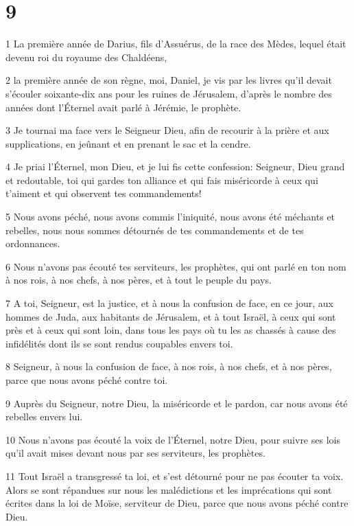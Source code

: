 \chapter{9}

\par 1 La première année de Darius, fils d'Assuérus, de la race des Mèdes, lequel était devenu roi du royaume des Chaldéens,
\par 2 la première année de son règne, moi, Daniel, je vis par les livres qu'il devait s'écouler soixante-dix ans pour les ruines de Jérusalem, d'après le nombre des années dont l'Éternel avait parlé à Jérémie, le prophète.
\par 3 Je tournai ma face vers le Seigneur Dieu, afin de recourir à la prière et aux supplications, en jeûnant et en prenant le sac et la cendre.
\par 4 Je priai l'Éternel, mon Dieu, et je lui fis cette confession: Seigneur, Dieu grand et redoutable, toi qui gardes ton alliance et qui fais miséricorde à ceux qui t'aiment et qui observent tes commandements!
\par 5 Nous avons péché, nous avons commis l'iniquité, nous avons été méchants et rebelles, nous nous sommes détournés de tes commandements et de tes ordonnances.
\par 6 Nous n'avons pas écouté tes serviteurs, les prophètes, qui ont parlé en ton nom à nos rois, à nos chefs, à nos pères, et à tout le peuple du pays.
\par 7 A toi, Seigneur, est la justice, et à nous la confusion de face, en ce jour, aux hommes de Juda, aux habitants de Jérusalem, et à tout Israël, à ceux qui sont près et à ceux qui sont loin, dans tous les pays où tu les as chassés à cause des infidélités dont ils se sont rendus coupables envers toi.
\par 8 Seigneur, à nous la confusion de face, à nos rois, à nos chefs, et à nos pères, parce que nous avons péché contre toi.
\par 9 Auprès du Seigneur, notre Dieu, la miséricorde et le pardon, car nous avons été rebelles envers lui.
\par 10 Nous n'avons pas écouté la voix de l'Éternel, notre Dieu, pour suivre ses lois qu'il avait mises devant nous par ses serviteurs, les prophètes.
\par 11 Tout Israël a transgressé ta loi, et s'est détourné pour ne pas écouter ta voix. Alors se sont répandues sur nous les malédictions et les imprécations qui sont écrites dans la loi de Moïse, serviteur de Dieu, parce que nous avons péché contre Dieu.
